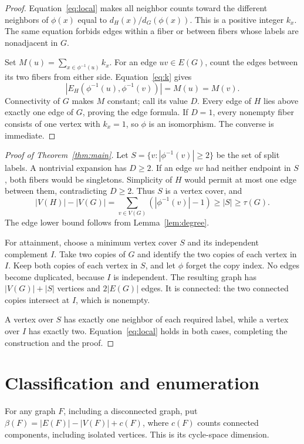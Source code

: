 \documentclass[11pt]{article}
\theoremstyle{definition}
\numberwithin{equation}{section}
\newcommand{\V}{V}
\newcommand{\E}{E}
\begin{document}
\begin{proof}
Equation~\eqref{eq:local} makes all neighbor counts toward the different
neighbors of $\phi(x)$ equal to $d_H(x)/d_G(\phi(x))$. This is a positive
integer $k_x$. The same equation forbids edges within a fiber or between
fibers whose labels are nonadjacent in $G$.

Set $M(u)=\sum_{x\in\phi^{-1}(u)}k_x$. For an edge $uv\in\E(G)$, count the
edges between its two fibers from either side. Equation~\eqref{eq:k} gives
\[
 |\E_H(\phi^{-1}(u),\phi^{-1}(v))|=M(u)=M(v).
\]
Connectivity of $G$ makes $M$ constant; call its value $D$. Every edge of
$H$ lies above exactly one edge of $G$, proving the edge formula. If $D=1$,
every nonempty fiber consists of one vertex with $k_x=1$, so $\phi$ is an
isomorphism. The converse is immediate.
\end{proof}

\begin{proof}[Proof of Theorem~\ref{thm:main}]
Let $S=\{v:|\phi^{-1}(v)|\ge2\}$ be the set of split labels. A nontrivial
expansion has $D\ge2$. If an edge $uv$ had neither endpoint in $S$, both
fibers would be singletons. Simplicity of $H$ would permit at most one edge
between them, contradicting $D\ge2$. Thus $S$ is a vertex cover, and
\[
 |\V(H)|-|\V(G)|
   =\sum_{v\in\V(G)}(|\phi^{-1}(v)|-1)
   \ge |S|\ge\tau(G).
\]
The edge lower bound follows from Lemma~\ref{lem:degree}.

For attainment, choose a minimum vertex cover $S$ and its independent
complement $I$. Take two copies of $G$ and identify the two copies of each
vertex in $I$. Keep both copies of each vertex in $S$, and let $\phi$ forget
the copy index. No edges become duplicated, because $I$ is independent.
The resulting graph has $|\V(G)|+|S|$ vertices and $2|\E(G)|$ edges.
It is connected: the two connected copies intersect at $I$, which is nonempty.

A vertex over $S$ has exactly one neighbor of each required label, while
a vertex over $I$ has exactly two. Equation~\eqref{eq:local} holds in both
cases, completing the construction and the proof.
\end{proof}

\section{Classification and enumeration}\label{sec:classification}

For any graph $F$, including a disconnected graph, put
$\beta(F)=|\E(F)|-|\V(F)|+c(F)$, where $c(F)$ counts connected components,
including isolated vertices. This is its cycle-space dimension.
\end{document}
